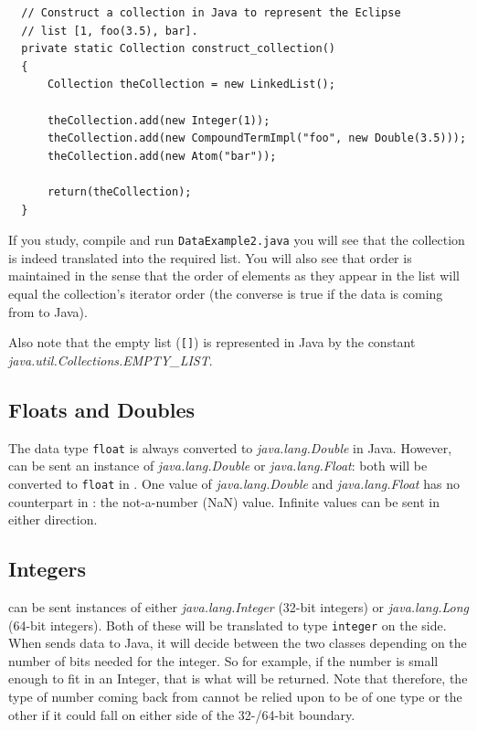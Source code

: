 \begin{verbatim}
  // Construct a collection in Java to represent the Eclipse 
  // list [1, foo(3.5), bar].
  private static Collection construct_collection()
  {
      Collection theCollection = new LinkedList();

      theCollection.add(new Integer(1));
      theCollection.add(new CompoundTermImpl("foo", new Double(3.5)));
      theCollection.add(new Atom("bar"));

      return(theCollection);
  }
\end{verbatim}

If you study, compile and run {\tt DataExample2.java} you will see
that the collection is indeed translated into the required {\eclipse}
list. You will also see that order is maintained in the sense that the
order of elements as they appear in the {\eclipse} list will equal the
collection's iterator order (the converse is true if the data is
coming from {\eclipse} to Java).

Also note that the {\eclipse} empty list ({\tt []}) is represented in
Java by the constant {\it java.util.Collections.EMPTY\_LIST}.

\subsection{Floats and Doubles}

The {\eclipse} data type {\tt float} is always converted to {\it
java.lang.Double} in Java. However, {\eclipse} can be sent an instance
of {\it java.lang.Double} or {\it java.lang.Float}: both will be
converted to {\tt float} in {\eclipse}. One value of {\it
java.lang.Double} and {\it java.lang.Float} has no counterpart in
{\eclipse}: the not-a-number (NaN) value. Infinite values can be sent
in either direction.

\subsection{Integers}
{\eclipse} can be sent instances of either {\it java.lang.Integer}
(32-bit integers) or {\it java.lang.Long} (64-bit integers). Both of
these will be translated to type {\tt integer} on the {\eclipse} side.
When {\eclipse} sends data to Java, it will decide between the two
classes depending on the number of bits needed for the integer. So for
example, if the number is small enough to fit in an Integer, that is
what will be returned. Note that therefore, the type of number
coming back from {\eclipse} cannot be relied upon to be of one type or
the other if it could fall on either side of the 32-/64-bit boundary.

